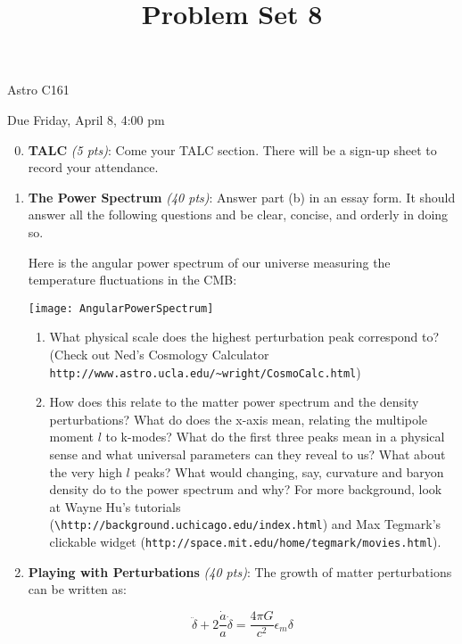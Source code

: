 \documentclass[12pt,preprint]{aastex}
\title{Problem Set 8}
\begin{document}
\maketitle
\centerline{Astro C161} 

\centerline{Due Friday, April 8, 4:00 pm}

\begin{enumerate}
\setcounter{enumi}{-1}

\item \textbf{TALC} \textit{(5 pts)}: Come your TALC section. There will be a sign-up sheet to record your attendance.

\item \textbf{The Power Spectrum} \textit{(40 pts)}: Answer part (b) in an essay form. It should answer all the following questions and be clear, concise, and orderly in doing so. 
	
Here is the angular power spectrum of our universe measuring the temperature fluctuations in the CMB:

\texttt{[image: AngularPowerSpectrum]}

\begin{enumerate}
	
	\item What physical scale does the highest perturbation peak correspond to? (Check out Ned's Cosmology Calculator \verb+http://www.astro.ucla.edu/~wright/CosmoCalc.html+) 

\item How does this relate to the matter power spectrum and the density perturbations? What do does the x-axis mean, relating the multipole moment $l$ to k-modes? What do the first three peaks mean in a physical sense and what universal parameters can they reveal to us? What about the very high $l$ peaks? What would changing, say, curvature and baryon density do to the power spectrum and why? For more background, look at Wayne Hu's tutorials (\verb+\http://background.uchicago.edu/index.html+)
and Max Tegmark's clickable widget (\verb+http://space.mit.edu/home/tegmark/movies.html+).
\end{enumerate}

\item \textbf{Playing with Perturbations} \textit{(40 pts)}: The growth of matter perturbations can be written as:

$$ \ddot{\delta} + 2 \frac{\dot{a}}{a}\dot{\delta} = \frac{4\pi G}{c^2} \epsilon_m \delta$$

\begin{enumerate}


\end{enumerate}
\end{enumerate}
\end{document}
